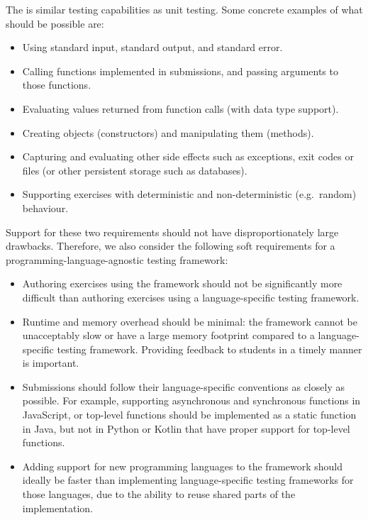 \documentclass[../main]{subfiles}
\begin{document}
The  is similar testing capabilities as unit testing.
Some concrete examples of what should be possible are:

\begin{itemize}
    \item Using standard input, standard output, and standard error.
    \item Calling functions implemented in submissions, and passing arguments to those functions.
    \item Evaluating values returned from function calls (with data type support).
    \item Creating objects (constructors) and manipulating them (methods).
    \item Capturing and evaluating other side effects such as exceptions, exit codes or files (or other persistent storage such as databases).
    \item Supporting exercises with deterministic and non-deterministic (e.g.\ random) behaviour.
\end{itemize}

Support for these two requirements should not have disproportionately large drawbacks.
Therefore, we also consider the following soft requirements for a programming-language-agnostic testing framework:

\begin{itemize}
    \item Authoring exercises using the framework should not be significantly more difficult than authoring exercises using a language-specific testing framework.
    \item Runtime and memory overhead should be minimal: the framework cannot be unacceptably slow or have a large memory footprint compared to a language-specific testing framework.
        Providing feedback to students in a timely manner is important.
    \item Submissions should follow their language-specific conventions as closely as possible.
        For example, supporting asynchronous and synchronous functions in JavaScript, or top-level functions should be implemented as a static function in Java, but not in Python or Kotlin that have proper support for top-level functions.
    \item Adding support for new programming languages to the framework should ideally be faster than implementing language-specific testing frameworks for those languages, due to the ability to reuse shared parts of the implementation.
\end{itemize}
\end{document}
